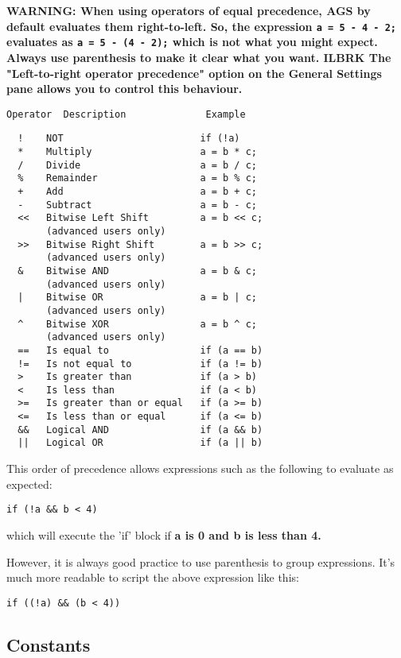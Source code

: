 \bf{WARNING:} When using operators of equal precedence, AGS by default evaluates them
right-to-left. So, the expression \verb$a = 5 - 4 - 2;$ evaluates as \verb$a = 5 - (4 - 2);$
which is not what you might expect. Always use parenthesis to make it clear what you want. ILBRK
The "Left-to-right operator precedence" option on the General Settings pane allows you to
control this behaviour.

\bf{\begin{verbatim}
Operator  Description              Example
\end{verbatim} }

\begin{verbatim}
  !    NOT                        if (!a)
  *    Multiply                   a = b * c;
  /    Divide                     a = b / c;
  %    Remainder                  a = b % c;
  +    Add                        a = b + c;
  -    Subtract                   a = b - c;
  <<   Bitwise Left Shift         a = b << c;
       (advanced users only)
  >>   Bitwise Right Shift        a = b >> c;
       (advanced users only)
  &    Bitwise AND                a = b & c;
       (advanced users only)
  |    Bitwise OR                 a = b | c;
       (advanced users only)
  ^    Bitwise XOR                a = b ^ c;
       (advanced users only)
  ==   Is equal to                if (a == b)
  !=   Is not equal to            if (a != b)
  >    Is greater than            if (a > b)
  <    Is less than               if (a < b)
  >=   Is greater than or equal   if (a >= b)
  <=   Is less than or equal      if (a <= b)
  &&   Logical AND                if (a && b)
  ||   Logical OR                 if (a || b)
\end{verbatim}

This order of precedence allows expressions such as the following to evaluate as expected:

\verb$if (!a && b < 4)$

which will execute the 'if' block if \bf{a} is 0 and \bf{b} is less than 4.

However, it is always good practice to use parenthesis to group expressions. It's much
more readable to script the above expression like this:

\verb$if ((!a) && (b < 4))$



\subsection{Constants}\label{Constants}%

